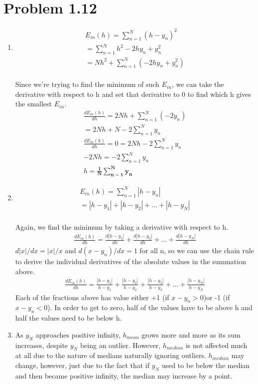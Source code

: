 \documentclass[12pt]{article}
\begin{document}
\section*{Problem 1.12}
\begin{enumerate}[label=(\alph*)]
	\item
	\begin{gather*}
		E_{in}(h) = \sum_{n=1}^{N}(h - y_n)^2
		\\ = \sum_{n=1}^{N}h^2 - 2hy_n + y_n^2 
		\\ = Nh^2 + \sum_{n=1}^{N}(-2hy_n + y_n^2)
	\end{gather*}
	\\ Since we're trying to find the minimum of such $E_{in}$, we can take the derivative with respect to h and set that derivative to 0 to find which h gives the smallest $E_{in}$.
	\begin{gather*}
		\frac{dE_{in}(h)}{dh} = 2Nh + \sum_{n=1}^{N}(-2y_n)
		\\ = 2Nh + N - 2\sum_{n=1}^{N}y_n
		\\ \frac{dE_{in}(h)}{dh} = 0 = 2Nh - 2\sum_{n=1}^{N}y_n
		\\ -2Nh = -2\sum_{n=1}^{N}y_n
		\\ h = \boldsymbol{\frac{1}{N}\sum_{n=1}^{N}y_n}
	\end{gather*}
	\item 
	\begin{gather*}
		E_{in}(h) = \sum_{n=1}^{N}|h - y_n|
		\\ = |h - y_1| + |h - y_2| + ... + |h - y_N|
	\end{gather*}
	\\ Again, we find the minimum by taking a derivative with respect to h.
	\begin{gather*}
		\frac{dE_{in}(h)}{dh} = \frac{d|h - y_1|}{dh} + \frac{d|h - y_2|}{dh} + ... + \frac{d|h - y_N|}{dh}
	\end{gather*}
	$d|x|/dx = |x|/x$ and $d(x - y_n)/dx = 1$ for all n, so we can use the chain rule to derive the individual derivatives of the absolute values in the summation above.
	\begin{gather*}
		\frac{dE_{in}(h)}{dh} = \frac{|h - y_1|}{h - y_1} + \frac{|h - y_2|}{h - y_2} + \frac{|h - y_3|}{h - y_3} + ... + \frac{|h - y_N|}{h - y_N}
	\end{gather*}
	Each of the fractions above has value either +1 (if $x - y_n > 0$)or -1 (if $x - y_n < 0$). In order to get to zero, half of the values have to be above h and half the values need to be below h.
	\item As $y_N$ approaches positive infinity, $h_{mean}$ grows more and more as its sum increases, despite $y_N$ being an outlier. However, $h_{median}$ is not affected much at all due to the nature of medians naturally ignoring outliers. $h_{median}$ may change, however, just due to the fact that if $y_N$ used to be below the median and then became positive infinity, the median may increase by a point.
\end{enumerate}
\end{document}
